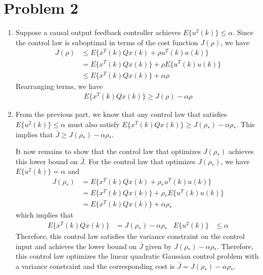 \section*{Problem 2}

\begin{enumerate}
    \item
    Suppose a causal output feedback controller achieves $E\{u^2(k)\} \leq \alpha$. Since the control law is suboptimal in terms of the cost function $J(\rho)$, we have
    \begin{align*}
        J(\rho) & \leq E \{ x^T(k) Qx(k) + \rho u^T(k) u(k) \} \\
        & = E \{ x^T(k) Qx(k) \} + \rho E \{ u^T(k) u(k) \} \\
        & \leq E \{ x^T(k) Qx(k) \} + \alpha \rho
    \end{align*}
    Rearranging terms, we have
    \begin{align*}
        E \{ x^T(k) Q x(k) \} \geq J(\rho) - \alpha \rho
    \end{align*}

    \item
    From the previous part, we know that any control law that satisfies $E\{u^2(k)\} \leq \alpha$ must also satisfy $E \{ x^T(k) Q x(k) \} \geq J(\rho_*) - \alpha \rho_*$. This implies that $\bar{J} \geq J(\rho_*) - \alpha \rho_*$.

    It now remains to show that the control law that optimizes $J(\rho_*)$ achieves this lower bound on $\bar{J}$. For the control law that optimizes $J(\rho_*)$, we have $E\{u^2(k)\} = \alpha$ and
    \begin{align*}
        J(\rho_*) & = E \{ x^T(k) Qx(k) + \rho_* u^T(k) u(k) \} \\
        & = E \{ x^T(k) Qx(k) \} + \rho_* E \{ u^T(k) u(k) \} \\
        & = E \{ x^T(k) Qx(k) \} + \alpha \rho_*
    \end{align*}
    which implies that
    \begin{align*}
        E \{ x^T(k) Q x(k) \} & = J(\rho_*) - \alpha \rho_*
            & E\{u^2(k)\} & \leq \alpha
    \end{align*}
    Therefore, this control law satisfies the variance constraint on the control input and achieves the lower bound on $\bar{J}$ given by $J(\rho_*) - \alpha \rho_*$. Therefore, this control law optimizes the linear quadratic Gaussian control problem with a variance constraint and the corresponding cost is $\bar{J} = J(\rho_*) - \alpha \rho_*$.
    
    
\end{enumerate}